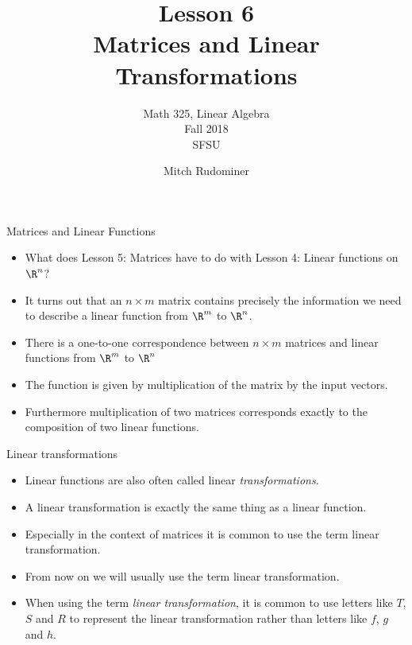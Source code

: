 \documentclass{beamer}
\title{Lesson 6 \\ Matrices and Linear Transformations}
\subtitle{Math 325, Linear Algebra \\ Fall 2018 \\ SFSU}
\author{Mitch Rudominer}
\date{}
\begin{document}
\begin{frame}
  \titlepage
\end{frame}



\begin{frame}{Matrices and Linear Functions}

\begin{itemize}
\item What does Lesson 5: Matrices have to do with Lesson 4: Linear functions on $\R^n$?
\item It turns out that an $n\times m$ matrix contains precisely the information we need
to describe a linear function from $\R^m$ to $\R^n$.
\item There is a one-to-one correspondence between $n\times m$ matrices and linear
functions from $\R^m$ to $\R^n$
\item The function is given by multiplication of the matrix by the input vectors.
\item Furthermore multiplication of two matrices corresponds exactly to the composition of two linear functions.
\end{itemize}

\end{frame}


\begin{frame}{Linear transformations}

\begin{itemize}
\item Linear functions are also often called linear \emph{transformations}.
\item A linear transformation is exactly the same thing as a linear function.
\item Especially in the context of matrices it is common to use the term
linear transformation.
\item From now on we will usually use the term linear transformation.
\item When using the term \emph{linear transformation}, it is common to use
letters like $T$, $S$ and $R$ to represent the linear transformation rather
than letters like $f$, $g$ and $h$.
\end{itemize}

\end{frame}

\end{document}
